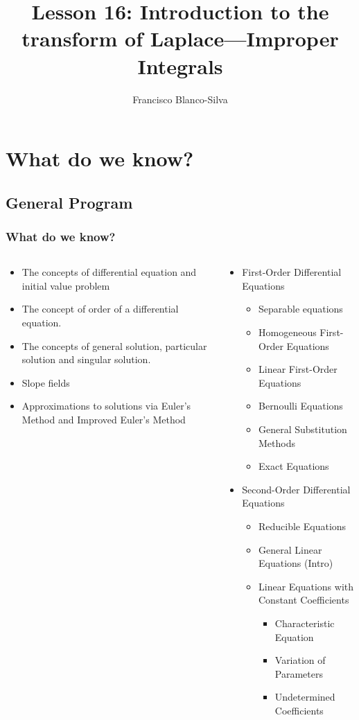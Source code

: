 \documentclass[9pt,xcolor=x11names,compress]{beamer}
\author[Francisco Blanco-Silva]{Francisco Blanco-Silva}
\institute[USC]{University of South Carolina}
\date{
\pgfdeclarelindenmayersystem{plant}{
	\rule{X -> F-[[X]+x]+F[+FX]-X}
	\rule{F -> FF}
}
\begin{tikzpicture}[color=DeepSkyBlue4,rotate=74]
    \draw [l-system={plant, axiom=X, order=6, step=0.5pt, angle=15}]
    lindenmayer system; 
	\end{tikzpicture}
	\begin{tikzpicture}[color=DeepSkyBlue4,rotate=74]
    \draw [l-system={plant, axiom=X, order=6, step=0.5pt, angle=25}] lindenmayer system;
	\end{tikzpicture}
	\begin{tikzpicture}[color=DeepSkyBlue4,rotate=74]
    \draw [l-system={plant, axiom=X, order=6, step=0.5pt, angle=30}] lindenmayer system;
	\end{tikzpicture}
}
\title{Lesson 16: Introduction to the transform of Laplace---Improper Integrals}
\begin{document}
\frame{\titlepage}

\section{What do we know?}
\subsection{General Program}
\begin{frame}\frametitle{What do we know?}
\begin{columns}[T]
\begin{column}{0.45\linewidth}
\begin{itemize}
\item The concepts of \alert{differential equation} and \alert{initial value problem}
\item The concept of \alert{order} of a differential equation.
\item The concepts of \alert{general solution}, \alert{particular solution} and \alert{singular solution}.
\item \alert{Slope fields}
\item Approximations to solutions via \alert{Euler's Method} and \alert{Improved Euler's Method}
\end{itemize} 
\end{column}
\begin{column}{0.55\linewidth}
\begin{itemize}
\item First-Order Differential Equations
\begin{itemize}
\item Separable equations 
\item Homogeneous First-Order Equations 
\item Linear First-Order Equations 
\item Bernoulli Equations 
\item General Substitution Methods
\item Exact Equations 
\end{itemize}
\item Second-Order Differential Equations
\begin{itemize}
	\item Reducible Equations
	\item General Linear Equations (Intro)
	\item Linear Equations with Constant Coefficients
	\begin{itemize}
		\item Characteristic Equation
		\item Variation of Parameters
		\item Undetermined Coefficients
	\end{itemize}
\end{itemize}
\end{itemize}
\end{column}
\end{columns}
\end{frame}
\end{document}
